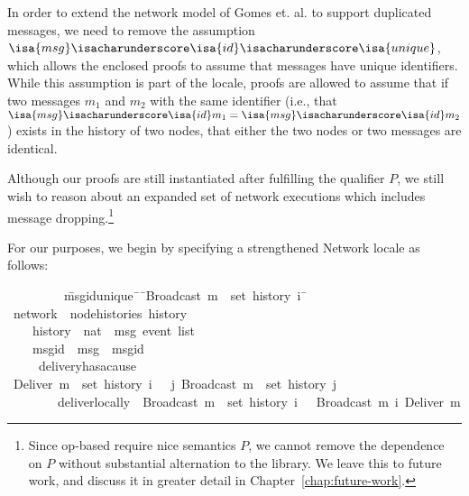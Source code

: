 In order to extend the network model of Gomes et. al. to support duplicated
messages, we need to remove the assumption
$\isa{msg}\isacharunderscore\isa{id}\isacharunderscore\isa{unique}$, which
allows the enclosed proofs to assume that messages have unique identifiers.
While this assumption is part of the locale, proofs are allowed to assume that
if two messages $m_1$ and $m_2$ with the same identifier (i.e., that
$\isa{msg}\isacharunderscore\isa{id} m_1 = \isa{msg}\isacharunderscore\isa{id}
m_2$) exists in the history of two nodes, that either the two nodes or two
messages are identical.

Although our proofs are still instantiated after fulfilling the qualifier $P$,
we still wish to reason about an expanded set of network executions which
includes message dropping.\footnote{Since op-based \CRDTs require nice semantics
$P$, we cannot remove the dependence on $P$ without substantial alternation to
the library. We leave this to future work, and discuss it in greater detail in
Chapter~\ref{chap:future-work}.}

For our purposes, we begin by specifying a strengthened Network locale as
follows:
\begin{isabelle}
~~~~~~~~\ \=msg{\isacharunderscore}id{\isacharunderscore}unique{\isacharcolon}\ \={\isasymrbrakk}\ \={\isachardoublequoteopen}Broadcast\ m\ {\isasymin}\ set\ {\isacharparenleft}history\ i{\isacharparenright}\ \=\kill
{}\ network\ {\isacharequal}\ node{\isacharunderscore}histories\ history\\
~~~~\>history\ {\isacharcolon}{\isacharcolon}\ {\isachardoublequoteopen}nat\ {\isasymRightarrow}\ {\isacharprime}msg\ event\ list{\isachardoublequoteclose}\ {\isacharplus}\\
~~~~\>msg{\isacharunderscore}id\ {\isacharcolon}{\isacharcolon}\ {\isachardoublequoteopen}{\isacharprime}msg\ {\isasymRightarrow}\ {\isacharprime}msgid{\isachardoublequoteclose}\\
~~~~\ delivery{\isacharunderscore}has{\isacharunderscore}a{\isacharunderscore}cause{\isacharcolon}\\
\>\>{\isasymlbrakk}\ {\isachardoublequoteopen}Deliver\ m\ {\isasymin}\ set\ {\isacharparenleft}history\ i{\isacharparenright}\ \>\>{\isasymrbrakk}\ {\isasymLongrightarrow}\ {\isasymexists}j{\isachardot}\ Broadcast\ m\ {\isasymin}\ set\ {\isacharparenleft}history\ j{\isacharparenright}{\isachardoublequoteclose}\\
~~~~~~~~\>deliver{\isacharunderscore}locally{\isacharcolon}\ \>{\isasymlbrakk}\ \>{\isachardoublequoteopen}Broadcast\ m\ {\isasymin}\ set\ {\isacharparenleft}history\ i{\isacharparenright}\ \>{\isasymrbrakk}\ {\isasymLongrightarrow}\  Broadcast\ m\ {\isasymsqsubset}\isactrlsup i\ Deliver\ m{\isachardoublequoteclose}\\
\end{isabelle}

